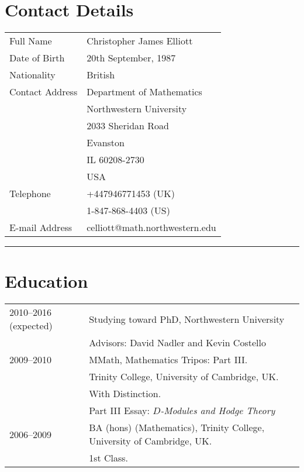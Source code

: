 \documentclass[10pt,oneside]{article}
\newcommand\T{\rule{0pt}{2.6ex}}
\newcommand\B{\rule[-1.2ex]{0pt}{0pt}}
\begin{document}
\section*{Contact Details}

\begin{tabular}{ll}
Full Name \quad \T& Christopher James Elliott \\

Date of Birth \quad \T& 20th September, 1987 \\

Nationality \quad \T& British \\

Contact Address \quad \T& Department of Mathematics \\
& Northwestern University \\
& 2033 Sheridan Road \\
& Evanston \\
& IL 60208-2730 \\
& USA \\


Telephone \T & +447946771453 (UK) \\
&1-847-868-4403 (US) \\

E-mail Address \quad \T\B& celliott@math.northwestern.edu \\
\end{tabular}

\vspace{\baselineskip}
\hspace{\fill}\rule{0.8\linewidth}{.7pt}\hspace{\fill}

\section*{Education}
\begin{tabular}{ll}
 2010--2016 (expected) \T & Studying toward PhD, Northwestern University \\
 & Advisors: David Nadler and Kevin Costello \\
 2009--2010 \qquad \qquad \qquad \, \T & MMath, Mathematics Tripos: Part III. \\
 & Trinity College, University of Cambridge, UK. \\
 & With Distinction. \\
 & Part III Essay: \emph{$D$-Modules and Hodge Theory} \\
 2006--2009 \T & BA (hons) (Mathematics), Trinity College, University of Cambridge, UK. \\
 & 1st Class. \\
\end{tabular}
\end{document}
